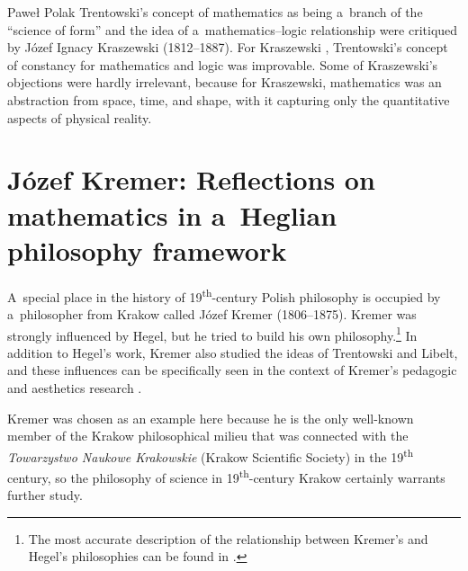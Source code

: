 \begin{artengenv}{Paweł Polak}
Trentowski's concept of mathematics as being a~branch of the ``science of form'' and the idea of a~mathematics–logic relationship were critiqued by Józef Ignacy Kraszewski (1812--1887). For Kraszewski
\parencites*[][pp.28–29]{kraszewski_system_1847}[][pp.28–29]{kraszewski_system_1862}, %
 Trentowski's concept of constancy for mathematics and logic was improvable. Some of Kraszewski's objections were hardly irrelevant, because for Kraszewski, mathematics was an abstraction from space, time, and shape, with it capturing only the quantitative aspects of physical reality.

\section*{Józef Kremer: Reflections on mathematics in a~Heglian philosophy framework}

A~special place in the history of 19\textsuperscript{th}-century Polish philosophy is occupied by a~philosopher from Krakow called Józef Kremer (1806–1875). Kremer was strongly influenced by Hegel, but he tried to build his own philosophy.\footnote{The most accurate description of the relationship between Kremer's and Hegel's philosophies can be found in
\parencite[][]{struve_zycie_1881}.%
} In addition to Hegel's work, Kremer also studied the ideas of Trentowski and Libelt, and these influences can be specifically seen in the context of Kremer's pedagogic and aesthetics research 
\parencites[][]{trentowski_chowanna_1842}[][]{trentowski_chowanna_1842-1}[][]{trentowski_myslini_1844-1}[][]{trentowski_myslini_1844}[][]{libelt_filozofia_1845}.%


Kremer was chosen as an example here because he is the only well-known member of the Krakow philosophical milieu that was connected with the \textit{Towarzystwo Naukowe Krakowskie} (Krakow Scientific Society) in the 19\textsuperscript{th} century, so the philosophy of science in 19\textsuperscript{th}-century Krakow certainly warrants further study.


\end{artengenv}
